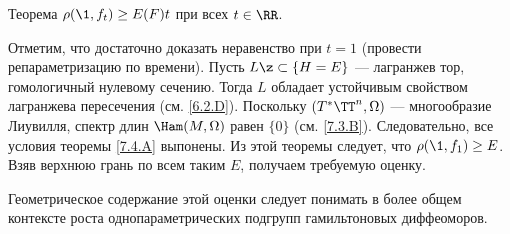 \begin{thm}{Теорема}\label{8.1.C}
$\rho (\1, f_t) \ge E (F) t$ при всех $t \in \RR$.
\end{thm}

Отметим, что достаточно доказать неравенство при $t = 1$ (провести репараметризацию по времени).
Пусть $L \z\subset \{H = E\}$ --- лагранжев тор, гомологичный нулевому сечению.
Тогда $L$ обладает устойчивым свойством лагранжева пересечения (см. \ref{6.2.D}).
Поскольку $(T^\ast \TT^n, \Omega)$ --- многообразие Лиувилля, спектр длин $\Ham (M, \Omega)$ равен $\{0\}$ (см. \ref{7.3.B}).
Следовательно, все условия теоремы \ref{7.4.A} выпонены.
Из этой теоремы следует, что $\rho (\1, f_1) \ge E$.
Взяв верхнюю грань по всем таким $E$, получаем требуемую оценку.
\qeds

Геометрическое содержание этой оценки следует понимать в более общем контексте роста однопараметрических подгрупп гамильтоновых диффеоморов.
